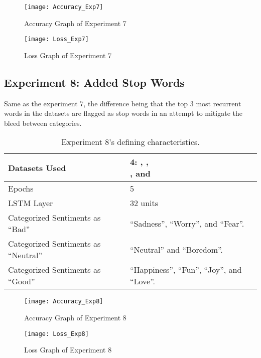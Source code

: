 \begin{figure}[!h]
	\centering
	\texttt{[image: Accuracy\_Exp7]}
	\caption{Accuracy Graph of Experiment 7}
	\label{fig:accuracy_exp7}
	\texttt{[image: Loss\_Exp7]}
	\caption{Loss Graph of Experiment 7}
	\label{fig:loss_exp7}
\end{figure}
\pagebreak

\subsection{Experiment 8: Added Stop Words}
\label{exp8}
Same as the experiment 7, the difference being that the top 3 most recurrent words in the datasets are flagged as stop words in an attempt to mitigate the bleed between categories.
\begin{table}[!h]
	\caption{Experiment 8's defining characteristics.}
	\vspace{0.5cm}
	\centering
	\begin{tabular}[t]{|l|l|}
	\hline
		Datasets Used & \makecell{4: \citet{d1}, \citet{d2},\\ \citet{d3}, and \citet{d4}}
	\\ \hline
		Epochs & 5
	\\ \hline
		LSTM Layer & 32 units
	\\ \hline
		Categorized Sentiments as ``Bad'' & ``Sadness'', ``Worry'', and ``Fear''.
	\\ \hline	
		 Categorized Sentiments as ``Neutral'' & ``Neutral'' and ``Boredom''.
	\\ \hline	
		Categorized Sentiments as ``Good'' & ``Happiness'', ``Fun'', ``Joy'', and ``Love''.
	\\ \hline
	\end{tabular}
\end{table}


\begin{figure}[!h]
	\centering
	\texttt{[image: Accuracy\_Exp8]}
	\caption{Accuracy Graph of Experiment 8}
	\label{fig:accuracy_exp8}
	\texttt{[image: Loss\_Exp8]}
	\caption{Loss Graph of Experiment 8}
	\label{fig:loss_exp8}
\end{figure}
\pagebreak

